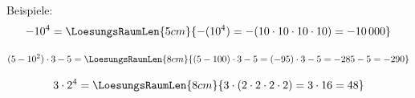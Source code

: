 Beispiele:
$$-10^4 = \LoesungsRaumLen{5cm}{-(10^4) = -  (10\cdot{}10\cdot{}10\cdot{}10) = -10\,000}$$

$$(5-10^2)\cdot{} 3 - 5 = \LoesungsRaumLen{8cm}{(5-100)\cdot{}3-5 =
  (-95)\cdot{}3 -5 = -285 - 5 = - 290} $$

$$3\cdot{} 2^4 = \LoesungsRaumLen{8cm}{3 \cdot{}
  (2\cdot{}2\cdot{}2\cdot{}2) = 3\cdot{}16 = 48} $$








